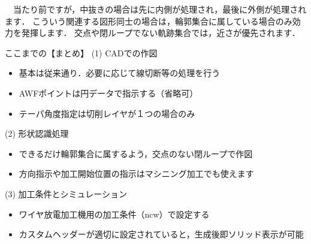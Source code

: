 　当たり前ですが，中抜きの場合は先に内側が処理され，最後に外側が処理されます．
こういう関連する図形同士の場合は，輪郭集合に属している場合のみ効力を発揮します．
交点や閉ループでない軌跡集合では，近さが優先されます．

\vspace*{3zh}
\begin{itembox}[l]{ここまでの【まとめ】}
(1) CADでの作図
\begin{itemize}
\item 基本は従来通り．必要に応じて線切断等の処理を行う
\item AWFポイントは円データで指示する（省略可）
\item テーパ角度指定は切削レイヤが１つの場合のみ
\end{itemize}
(2) 形状認識処理
\begin{itemize}
\item できるだけ輪郭集合に属するよう，交点のない閉ループで作図
\item 方向指示や加工開始位置の指示はマシニング加工でも使えます
\end{itemize}
(3) 加工条件とシミュレーション
\begin{itemize}
\item ワイヤ放電加工機用の加工条件（ncw）で設定する
\item カスタムヘッダーが適切に設定されていると，生成後即ソリッド表示が可能
\end{itemize}
\end{itembox}

